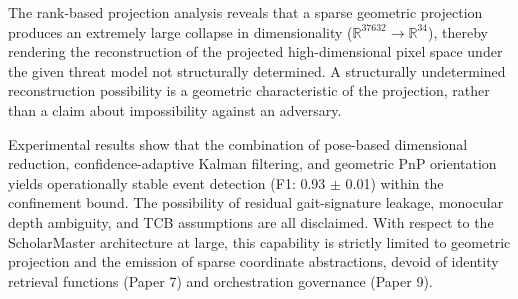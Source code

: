 \documentclass[conference]{IEEEtran}
\begin{document}
The rank-based projection analysis reveals that a sparse geometric projection produces an extremely large collapse in dimensionality ($\mathbb{R}^{37632} \rightarrow \mathbb{R}^{34}$), thereby rendering the reconstruction of the projected high-dimensional pixel space under the given threat model not structurally determined. A structurally undetermined reconstruction possibility is a geometric characteristic of the projection, rather than a claim about impossibility against an adversary.

Experimental results show that the combination of pose-based dimensional reduction, confidence-adaptive Kalman filtering, and geometric PnP orientation yields operationally stable event detection (F1: 0.93 $\pm$ 0.01) within the confinement bound. The possibility of residual gait-signature leakage, monocular depth ambiguity, and TCB assumptions are all disclaimed. With respect to the ScholarMaster architecture at large, this capability is strictly limited to geometric projection and the emission of sparse coordinate abstractions, devoid of identity retrieval functions (Paper 7) and orchestration governance (Paper 9).
\end{document}
